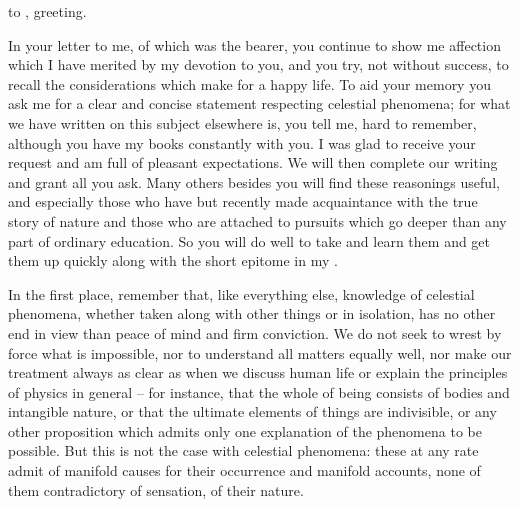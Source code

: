 \documentclass{stex}
\begin{document}

\noindent {} to , greeting.

In your letter to me, of which  was the bearer, you continue to show me affection which I have merited by my devotion to you, and you try, not without success, to recall the considerations which make for a happy life.
To aid your memory you ask me for a clear and concise statement respecting celestial phenomena; for what we have written on this subject elsewhere is, you tell me, hard to remember, although you have my books constantly with you.
I was glad to receive your request and am full of pleasant expectations.
We will then complete our writing and grant all you ask.
Many others besides you will find these reasonings useful, and especially those who have but recently made acquaintance with the true story of nature and those who are attached to pursuits which go deeper than any part of ordinary education.
So you will do well to take and learn them and get them up quickly along with the short epitome in my .

In the first place, remember that, like everything else, knowledge of celestial phenomena, whether taken along with other things or in isolation, has no other end in view than peace of mind and firm conviction.
We do not seek to wrest by force what is impossible, nor to understand all matters equally well, nor make our treatment always as clear as when we discuss human life or explain the principles of physics in general – for instance, that the whole of being consists of bodies and intangible nature, or that the ultimate elements of things are indivisible, or any other proposition which admits only one explanation of the phenomena to be possible.
But this is not the case with celestial phenomena: these at any rate admit of manifold causes for their occurrence and manifold accounts, none of them contradictory of sensation, of their nature.
\end{document}
